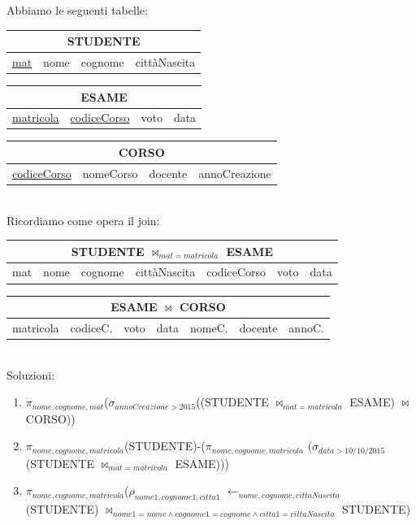 \documentclass[a4paper]{article}
\begin{document}
\begin{mybox}{}
  Abbiamo le seguenti tabelle:\medskip\\
  \begin{tabular}{|c|c|c|c|}
    \hline
    \multicolumn{4}{|c|}{STUDENTE}\\
    \hline
    \underline{mat} & nome & cognome & cittàNascita\\
    \hline
  \end{tabular}
\medskip

\begin{tabular}{|c|c|c|c|}
  \hline
  \multicolumn{4}{|c|}{ESAME}\\
  \hline
  \underline{matricola} & \underline{codiceCorso} & voto & data\\
  \hline
\end{tabular}
\medskip

\begin{tabular}{|c|c|c|c|}
  \hline
  \multicolumn{4}{|c|}{CORSO}\\
  \hline
  \underline{codiceCorso} & nomeCorso & docente & annoCreazione\\
  \hline
\end{tabular}
\medskip\medskip\\
%
Ricordiamo come opera il join:\medskip\\
\begin{tabular}{|c|c|c|c|c|c|c|}
  \hline
  \multicolumn{7}{|c|}{STUDENTE $\Join_{mat=matricola}$ ESAME}\\
  \hline
  mat & nome & cognome & cittàNascita & codiceCorso & voto & data\\
  \hline
\end{tabular}
\medskip

\begin{tabular}{|c|c|c|c|c|c|c|}
  \hline
  \multicolumn{7}{|c|}{ESAME $\Join$ CORSO}\\
  \hline
  matricola & codiceC. & voto & data & nomeC. & docente & annoC.\\
  \hline
\end{tabular}
\medskip\\
%
Soluzioni:
\begin{enumerate}
  \item $\pi_{nome, cognome, mat}$($\sigma_{annoCreazione>2015}$((STUDENTE $\Join_{mat=matricola}$ ESAME) $\Join$ CORSO))
  \item $\pi_{nome, cognome, matricola}$(STUDENTE)-($\pi_{nome, cognome, matricola}$ ($\sigma_{data>10/10/2015}$(STUDENTE $\Join_{mat=matricola}$ ESAME)))
  \item $\pi_{nome, cognome, matricola}$($\rho_{nome1, cognome1, citta1}$ $\leftarrow _{nome, cognome, cittaNascita}$(STUDENTE) $\Join_{nome1=nome \land cognome1=cognome \land citta1=cittaNascita}$ STUDENTE)
\end{enumerate}
\end{mybox}
\end{document}
